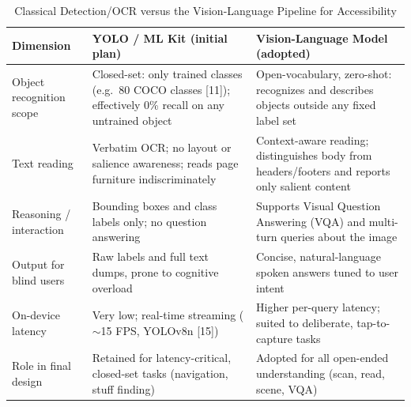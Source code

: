 \documentclass[a4paper]{report}
\begin{document}
\begin{table}[H]
\centering
\caption{Classical Detection/OCR versus the Vision-Language Pipeline for Accessibility}
\label{tab:vlm-vs-classical}
\begin{tabularx}{\textwidth}{|>{\raggedright\arraybackslash}p{}|>{\raggedright\arraybackslash}X|>{\raggedright\arraybackslash}X|}
\hline
\textbf{Dimension} & \textbf{YOLO / ML Kit (initial plan)} & \textbf{Vision-Language Model (adopted)} \\
\hline
Object recognition scope & Closed-set: only trained classes (e.g.\ 80 COCO classes [11]); effectively 0\% recall on any untrained object & Open-vocabulary, zero-shot: recognizes and describes objects outside any fixed label set \\
\hline
Text reading & Verbatim OCR; no layout or salience awareness; reads page furniture indiscriminately & Context-aware reading; distinguishes body from headers/footers and reports only salient content \\
\hline
Reasoning / interaction & Bounding boxes and class labels only; no question answering & Supports Visual Question Answering (VQA) and multi-turn queries about the image \\
\hline
Output for blind users & Raw labels and full text dumps, prone to cognitive overload & Concise, natural-language spoken answers tuned to user intent \\
\hline
On-device latency & Very low; real-time streaming ($\sim$15 FPS, YOLOv8n [15]) & Higher per-query latency; suited to deliberate, tap-to-capture tasks \\
\hline
Role in final design & Retained for latency-critical, closed-set tasks (navigation, stuff finding) & Adopted for all open-ended understanding (scan, read, scene, VQA) \\
\hline
\end{tabularx}
\end{table}
\end{document}
